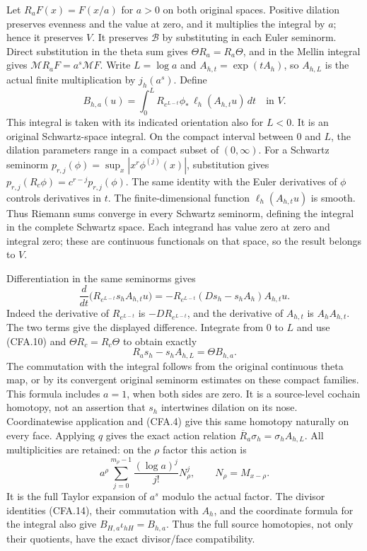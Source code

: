 Let $R_aF(x)=F(x/a)$ for $a>0$ on both original spaces.
Positive dilation preserves evenness and the value at zero, and it
multiplies the integral by $a$; hence it preserves $V$.
It preserves $\mathscr B$ by substituting in each Euler seminorm.
Direct substitution in the theta sum gives
$\Theta R_a=R_a\Theta$, and in the Mellin integral gives
$\mathcal MR_aF=a^s\mathcal MF$.
Write $L=\log a$ and $A_{h,t}=\exp(tA_h)$, so $A_{h,L}$ is
the actual finite multiplication by $j_h(a^s)$.  Define
\[
 B_{h,a}(u)=\int_0^L R_{e^{L-t}}\phi_*\,
                          \ell_h(A_{h,t}u)\,dt\quad\text{in }V.
                                                               \tag{CFA.15}
\]
This integral is taken with its indicated orientation also for
$L<0$.  It is an original Schwartz-space integral.  On the compact
interval between $0$ and $L$, the dilation parameters range in a
compact subset of $(0,\infty)$.  For a Schwartz seminorm
$p_{r,j}(\phi)=\sup_x|x^r\phi^{(j)}(x)|$, substitution gives
$p_{r,j}(R_c\phi)=c^{r-j}p_{r,j}(\phi)$.  The same identity with
the Euler derivatives of $\phi$ controls derivatives in $t$.
The finite-dimensional function $\ell_h(A_{h,t}u)$ is smooth.
Thus Riemann sums converge in every Schwartz seminorm, defining
the integral in the complete Schwartz space.  Each integrand has
value zero at zero and integral zero; these are continuous functionals
on that space, so the result belongs to $V$.

Differentiation in the same seminorms gives
\[
 \frac{d}{dt}\bigl(R_{e^{L-t}}s_hA_{h,t}u\bigr)
 =-R_{e^{L-t}}(Ds_h-s_hA_h)A_{h,t}u.
                                                               \tag{CFA.16}
\]
Indeed the derivative of $R_{e^{L-t}}$ is $-D R_{e^{L-t}}$, and
the derivative of $A_{h,t}$ is $A_hA_{h,t}$.  The two terms give
the displayed difference.  Integrate from $0$ to $L$ and use
(CFA.10) and $\Theta R_c=R_c\Theta$ to obtain exactly
\[
 R_as_h-s_hA_{h,L}=\Theta B_{h,a}.                             \tag{CFA.17}
\]
The commutation with the integral follows from the original continuous
theta map, or by its convergent original seminorm estimates on these
compact families.  This formula includes $a=1$, when both sides are
zero.  It is a source-level cochain homotopy, not an assertion that
$s_h$ intertwines dilation on its nose.  Coordinatewise application
and (CFA.4) give this same homotopy naturally on every face.
Applying $q$ gives the exact action relation
$\overline R_a\sigma_h=\sigma_hA_{h,L}$.
All multiplicities are retained: on the $\rho$ factor this action is
\[
 a^\rho\sum_{j=0}^{m_\rho-1}
       \frac{(\log a)^j}{j!}N_\rho^j,\qquad
 N_\rho=M_{x-\rho}.                                         \tag{CFA.18}
\]
It is the full Taylor expansion of $a^s$ modulo the actual factor.
The divisor identities (CFA.14), their commutation with $A_h$, and
the coordinate formula for the integral also give
$B_{H,a}\iota_{hH}=B_{h,a}$.  Thus the full source homotopies, not
only their quotients, have the exact divisor/face compatibility.


